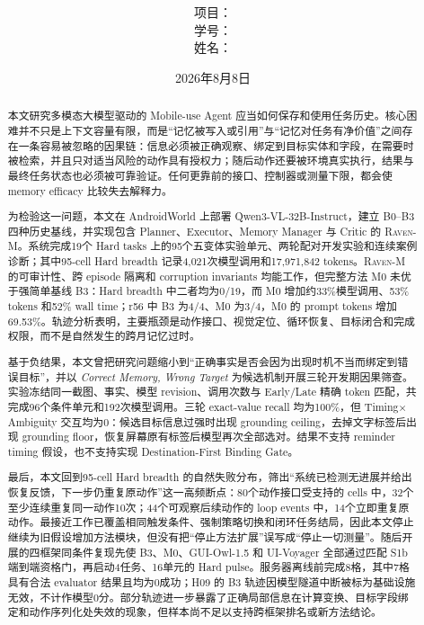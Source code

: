 \documentclass[12pt,a4paper]{ctexart}
\title{
    \vspace{-2em}
    \heiti \zihao{2} \papertitle\\
    \vspace{0.6em}
    \zihao{3} \papersubtitle
}
\author{
    \songti \zihao{4}
    项目：\coursename\\
    学号：\studentid\\
    姓名：\studentname
}
\date{2026年8月8日}
\newcommand{\ravenm}{\textsc{Raven-M}}
\begin{document}
\maketitle
\thispagestyle{plain}

\begin{abstract}
本文研究多模态大模型驱动的 Mobile-use Agent 应当如何保存和使用任务历史。核心困难并不只是上下文容量有限，而是“记忆被写入或引用”与“记忆对任务有净价值”之间存在一条容易被忽略的因果链：信息必须被正确观察、绑定到目标实体和字段，在需要时被检索，并且只对适当风险的动作具有授权力；随后动作还要被环境真实执行，结果与最终任务状态也必须被可靠验证。任何更靠前的接口、控制器或测量下限，都会使 memory efficacy 比较失去解释力。

为检验这一问题，本文在 AndroidWorld 上部署 Qwen3-VL-32B-Instruct，建立 B0--B3 四种历史基线，并实现包含 Planner、Executor、Memory Manager 与 Critic 的 \ravenm{}。系统完成19个 Hard tasks 上的95个五变体实验单元、两轮配对开发实验和连续案例诊断；其中95-cell Hard breadth 记录4,021次模型调用和17,971,842 tokens。\ravenm{} 的可审计性、跨 episode 隔离和 corruption invariants 均能工作，但完整方法 M0 未优于强简单基线 B3：Hard breadth 中二者均为0/19，而 M0 增加约33\%模型调用、53\% tokens 和52\% wall time；r56 中 B3 为4/4、M0 为3/4，M0 的 prompt tokens 增加69.53\%。轨迹分析表明，主要瓶颈是动作接口、视觉定位、循环恢复、目标闭合和完成权限，而不是自然发生的跨月记忆过时。

基于负结果，本文曾把研究问题缩小到“正确事实是否会因为出现时机不当而绑定到错误目标”，并以 \textit{Correct Memory, Wrong Target} 为候选机制开展三轮开发期因果筛查。实验冻结同一截图、事实、模型 revision、调用次数与 Early/Late 精确 token 匹配，共完成96个条件单元和192次模型调用。三轮 exact-value recall 均为100\%，但 Timing$\times$Ambiguity 交互均为0：候选目标信息过强时出现 grounding ceiling，去掉文字标签后出现 grounding floor，恢复屏幕原有标签后模型再次全部选对。结果不支持 reminder timing 假设，也不支持实现 Destination-First Binding Gate。

最后，本文回到95-cell Hard breadth 的自然失败分布，筛出“系统已检测无进展并给出恢复反馈，下一步仍重复原动作”这一高频断点：80个动作接口受支持的 cells 中，32个至少连续重复同一动作10次；44个可观察后续动作的 loop events 中，14个立即重复原动作。最接近工作已覆盖相同触发条件、强制策略切换和闭环任务结局，因此本文停止继续为旧假设增加方法模块，但没有把“停止方法扩展”误写成“停止一切测量”。随后开展的四框架同条件复现先使 B3、M0、GUI-Owl-1.5 和 UI-Voyager 全部通过匹配 S1b 端到端资格门，再启动4任务、16单元的 Hard pulse。服务器离线前完成8格，其中7格具有合法 evaluator 结果且均为0成功；H09 的 B3 轨迹因模型隧道中断被标为基础设施无效，不计作模型0分。部分轨迹进一步暴露了正确局部信息在计算变换、目标字段绑定和动作序列化处失效的现象，但样本尚不足以支持跨框架排名或新方法结论。


\end{abstract}
\end{document}
